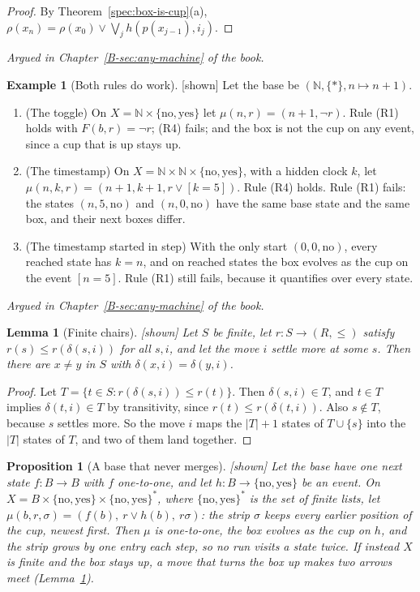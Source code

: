 \documentclass[11pt, a4paper]{article}
\theoremstyle{plain}
\newtheorem{proposition}[theorem]{Proposition}
\newtheorem{lemma}[theorem]{Lemma}
\theoremstyle{definition}
\newtheorem{example}[theorem]{Example}
\theoremstyle{remark}
\newcommand{\N}{\mathbb{N}}
\newcommand{\Bool}{\{\mathrm{no},\mathrm{yes}\}}
\newcommand{\step}{\delta}
\newcommand{\rd}{r}
\newcommand{\argued}[1]{\par\noindent\textit{Argued in Chapter~\ref{B-#1} of the book.}\par}
\newcommand{\kind}[1]{\textup{[#1]}}
\begin{document}
\begin{proof}
By Theorem~\ref{spec:box-is-cup}(a), $\rho(x_n)=\rho(x_0)\lor\bigvee_{j}h(p(x_{j-1}),i_j)$.
\end{proof}

\argued{sec:any-machine}

\begin{example}[Both rules do work]\label{spec:toggle-timestamp} \kind{shown}
Let the base be $(\N,\{\ast\},n\mapsto n+1)$.
\begin{enumerate}[label=(\alph*)]
\item (The toggle) On $X=\N\times\Bool$ let $\mu(n,r)=(n+1,\neg r)$. Rule (R1) holds with $F(b,r)=\neg r$;
(R4) fails; and the box is not the cup on any event, since a cup that is up stays up.
\item (The timestamp) On $X=\N\times\N\times\Bool$, with a hidden clock $k$, let
$\mu(n,k,r)=(n+1,k+1,r\lor[k=5])$. Rule (R4) holds. Rule (R1) fails: the states $(n,5,\mathrm{no})$ and
$(n,0,\mathrm{no})$ have the same base state and the same box, and their next boxes differ.
\item (The timestamp started in step) With the only start $(0,0,\mathrm{no})$, every reached state has
$k=n$, and on reached states the box evolves as the cup on the event $[n=5]$. Rule (R1) still fails,
because it quantifies over every state.
\end{enumerate}
\end{example}

\argued{sec:any-machine}

\begin{lemma}[Finite chairs]\label{spec:finite-chairs} \kind{shown}
Let $S$ be finite, let $\rd:S\to(R,\le)$ satisfy $\rd(s)\le\rd(\step(s,i))$ for all $s,i$, and let the move
$i$ settle more at some $s$. Then there are $x\ne y$ in $S$ with $\step(x,i)=\step(y,i)$.
\end{lemma}

\begin{proof}
Let $T=\{t\in S:\rd(\step(s,i))\le\rd(t)\}$. Then $\step(s,i)\in T$, and $t\in T$ implies $\step(t,i)\in T$
by transitivity, since $\rd(t)\le\rd(\step(t,i))$. Also $s\notin T$, because $s$ settles more. So the move
$i$ maps the $|T|+1$ states of $T\cup\{s\}$ into the $|T|$ states of $T$, and two of them land together.
\end{proof}

\begin{proposition}[A base that never merges]\label{spec:history-cup} \kind{shown}
Let the base have one next state $f:B\to B$ with $f$ one-to-one, and let $h:B\to\Bool$ be an event. On
$X=B\times\Bool\times\Bool^{*}$, where $\Bool^{*}$ is the set of finite lists, let
$\mu(b,r,\sigma)=(f(b),\ r\lor h(b),\ r\sigma)$: the strip $\sigma$ keeps every earlier position of the cup,
newest first. Then $\mu$ is one-to-one, the box evolves as the cup on $h$, and the strip grows by one entry
each step, so no run visits a state twice. If instead $X$ is finite and the box stays up, a move that turns
the box up makes two arrows meet (Lemma~\ref{spec:finite-chairs}).
\end{proposition}
\end{document}
